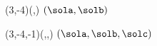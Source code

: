 \VECTORABSVALUE(3,-4)(\sola,\solb)
$(\sola,\solb)$

\VECTORABSVALUE(3,-4,-1)(\sola,\solb,\solc)
$(\sola,\solb,\solc)$
